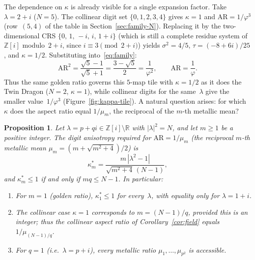 \documentclass{amsart}
\newtheorem{proposition}[theorem]{Proposition}
\theoremstyle{definition}
\theoremstyle{remark}
\begin{document}
The dependence on $\kappa$ is already visible for a single
expansion factor.
Take $\lambda = 2+i$ ($N\!=\!5$).
The collinear digit set $\{0,1,2,3,4\}$ gives $\kappa=1$ and
$\mathrm{AR}=1/\varphi^3$ (row~$(5,4)$ of the table in
Section~\ref{sec:family-N}).
Replacing it by the two-dimensional CRS
$\{0,\,1,\,-i,\,i,\,1\!+\!i\}$
(which is still a complete residue system of $\mathbb{Z}[i]$
modulo~$2\!+\!i$, since $i\equiv 3\pmod{2\!+\!i}$)
yields $\sigma^2=4/5$, $\tau=(-8+6i)/25$, and $\kappa=1/2$.
Substituting into~\eqref{eq:family}:
\[
  \mathrm{AR}^2
  = \frac{\sqrt{5}-1}{\sqrt{5}+1}
  = \frac{3-\sqrt{5}}{2}
  = \frac{1}{\varphi^2},
  \qquad
  \mathrm{AR} = \frac{1}{\varphi}.
\]
Thus the same golden ratio governs this $5$-map tile with $\kappa=1/2$
as it does the Twin Dragon ($N\!=\!2$, $\kappa\!=\!1$),
while collinear digits for the same~$\lambda$ give the smaller
value~$1/\varphi^3$ (Figure~\ref{fig:kappa-tile}).
A natural question arises: for which~$\kappa$ does the aspect ratio
equal $1/\mu_m$, the reciprocal of the $m$-th metallic mean?

\begin{proposition}\label{prop:golden}
Let $\lambda = p+qi \in \mathbb{Z}[i]\setminus\mathbb{R}$ with
$|\lambda|^2 = N$, and let $m\geq 1$ be a positive integer.
The digit anisotropy required for $\mathrm{AR}=1/\mu_m$
\textup{(}the reciprocal $m$-th metallic mean
$\mu_m=(m+\sqrt{m^2+4})/2$\textup{)} is
\begin{equation}\label{eq:kappa-m}
  \kappa_m^*
  = \frac{m\,|\lambda^2-1|}{\sqrt{m^2+4}\,(N-1)},
\end{equation}
and $\kappa_m^*\leq 1$ if and only if $mq\leq N-1$.
In particular:
\begin{enumerate}[\upshape(a)]
\item For $m=1$ \textup{(}golden ratio\textup{)},
  $\kappa_1^*\leq 1$ for every~$\lambda$,
  with equality only for $\lambda=1+i$.
\item The collinear case $\kappa=1$ corresponds to
  $m=(N\!-\!1)/q$, provided this is an integer;
  thus the collinear aspect ratio of
  Corollary~\textup{\ref{cor:field}} equals
  $1/\mu_{(N-1)/q}$.
\item For $q=1$ \textup{(}i.e.\ $\lambda=p+i$\textup{)},
  every metallic ratio $\mu_1,\ldots,\mu_{p^2}$ is accessible.
\end{enumerate}
\end{proposition}
\end{document}

